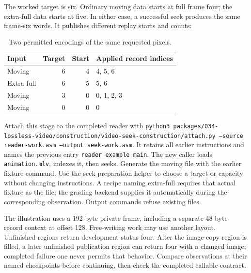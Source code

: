The worked target is six. Ordinary moving data starts at full frame four; the
extra-full data starts at five. In either case, a successful seek produces the
same frame-six words. It publishes different replay starts and counts:

\begin{table}[htbp]
  \centering
  \caption{Two permitted encodings of the same requested pixels.}
  \begin{tabular}{l r r l}
    \toprule
    Input      & Target & Start & Applied record indices \\
    \midrule
    Moving     & 6      & 4     & 4, 5, 6                \\
    Extra full & 6      & 5     & 5, 6                   \\
    Moving     & 3      & 0     & 0, 1, 2, 3             \\
    Moving     & 0      & 0     & 0                      \\
    \bottomrule
  \end{tabular}
\end{table}

Attach this stage to the completed reader with
\texttt{python3 packages/034-lossless-video/construction/video-seek-construction/attach.py --source reader-work.asm
  --output seek-work.asm}. It retains all earlier instructions and names the previous
entry \texttt{reader\_example\_main}. The new caller loads \texttt{animation.mlv},
indexes it, then seeks. Generate the moving file with the earlier fixture command.
Use the seek preparation helper to choose a target or capacity without changing
instructions. A recipe naming extra-full requires that actual fixture as the file;
the grading backend supplies it automatically during the corresponding observation.
Output commands refuse existing files.

The illustration uses a 192-byte private frame, including a separate 48-byte record
context at offset 128. Free-writing work may use another layout. Unfinished regions
return development status four. After the image-copy region is filled, a later
unfinished publication region can return four with a changed image; completed
failure one never permits that behavior. Compare observations at their named
checkpoints before continuing, then check the completed callable contract.
